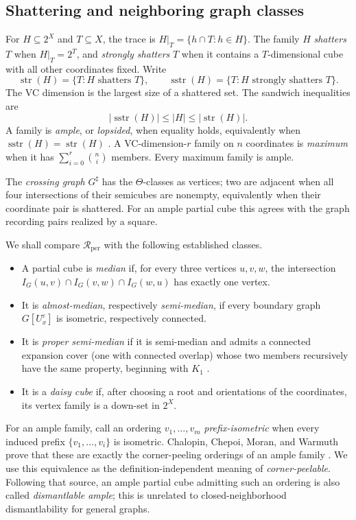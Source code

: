 \documentclass[11pt]{article}
\theoremstyle{definition}
\theoremstyle{remark}
\newcommand{\Rper}{\mathcal R_{\mathrm{per}}}
\newcommand{\strc}{\operatorname{str}}
\newcommand{\sstrc}{\operatorname{sstr}}
\newcommand{\eps}{\varepsilon}
\begin{document}
\subsection{Shattering and neighboring graph classes}

For \(H\subseteq2^X\) and \(T\subseteq X\), the trace is
\(H|_T=\{h\cap T:h\in H\}\).  The family \(H\) \emph{shatters} \(T\) when
\(H|_T=2^T\), and \emph{strongly shatters} \(T\) when it contains a
\(T\)-dimensional cube with all other coordinates fixed.  Write
\[
 \strc(H)=\{T:H\text{ shatters }T\},\qquad
 \sstrc(H)=\{T:H\text{ strongly shatters }T\}.
\]
The VC dimension is the largest size of a shattered set.  The sandwich
inequalities are
\[
 |\sstrc(H)|\le |H|\le|\strc(H)|.
\]
A family is \emph{ample}, or \emph{lopsided}, when equality holds,
equivalently when \(\sstrc(H)=\strc(H)\)
\cite{BandeltCDK06}.  A VC-dimension-\(r\) family on \(n\) coordinates is
\emph{maximum} when it has \(\sum_{i=0}^r\binom ni\) members.  Every maximum
family is ample.

The \emph{crossing graph} \(G^\sharp\) has the \(\Theta\)-classes as vertices;
two are adjacent when all four intersections of their semicubes are
nonempty, equivalently when their coordinate pair is shattered.  For an
ample partial cube this agrees with the graph recording pairs realized by a
square.

We shall compare \(\Rper\) with the following established classes.
\begin{itemize}[leftmargin=2em]
  \item A partial cube is \emph{median} if, for every three vertices
        \(u,v,w\), the intersection
        \(I_G(u,v)\cap I_G(v,w)\cap I_G(w,u)\) has exactly one vertex.
  \item It is \emph{almost-median}, respectively \emph{semi-median}, if every
        boundary graph \(G[U_x^\eps]\) is isometric, respectively connected.
  \item It is \emph{proper semi-median} if it is semi-median and admits a
        connected expansion cover (one with connected overlap) whose two members recursively have the
        same property, beginning with \(K_1\)
        \cite[Section~3, class~(10)]{journals/jgt/BresarIKMS02}.
  \item It is a \emph{daisy cube} if, after choosing a root and orientations
        of the coordinates, its vertex family is a down-set in \(2^X\).
\end{itemize}

For an ample family, call an ordering \(v_1,\ldots,v_m\)
\emph{prefix-isometric} when every induced prefix
\(\{v_1,\ldots,v_i\}\) is isometric.  Chalopin, Chepoi, Moran, and Warmuth
prove that these are exactly the corner-peeling orderings of an ample family
\cite[Proposition~4.2]{ChalopiChepoiMoran22}.  We use this equivalence as the
definition-independent meaning of \emph{corner-peelable}.  Following that
source, an ample partial cube admitting such an ordering is also called
\emph{dismantlable ample}; this is unrelated to closed-neighborhood
dismantlability for general graphs.
\end{document}
